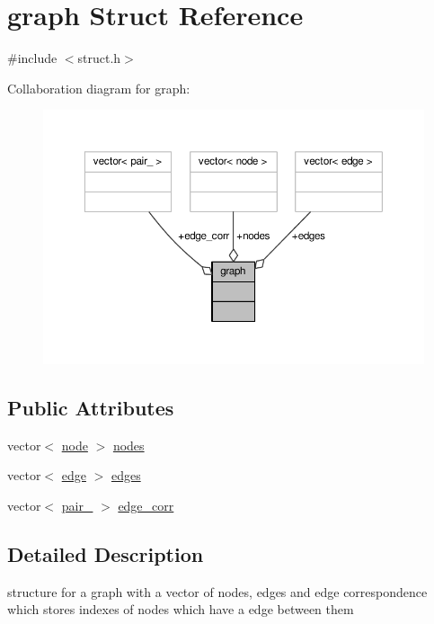 \hypertarget{structgraph}{}\section{graph Struct Reference}
\label{structgraph}


{\ttfamily \#include $<$struct.\+h$>$}



Collaboration diagram for graph\+:
\nopagebreak
\begin{figure}[H]
\begin{center}
\leavevmode
\includegraphics[width=350pt]{structgraph__coll__graph}
\end{center}
\end{figure}
\subsection*{Public Attributes}
\begin{DoxyCompactItemize}
\item 
vector$<$ \hyperlink{structnode}{node} $>$ \hyperlink{structgraph_a3f0cd3084820df42d55295028391b7f9}{nodes}
\item 
vector$<$ \hyperlink{structedge}{edge} $>$ \hyperlink{structgraph_a3832d0d179ca14c98114098695084b79}{edges}
\item 
vector$<$ \hyperlink{structpair__}{pair\+\_\+} $>$ \hyperlink{structgraph_abc20116f297a8a8366e95515562f1ecf}{edge\+\_\+corr}
\end{DoxyCompactItemize}


\subsection{Detailed Description}
structure for a graph with a vector of nodes, edges and edge correspondence which stores indexes of nodes which have a edge between them 

